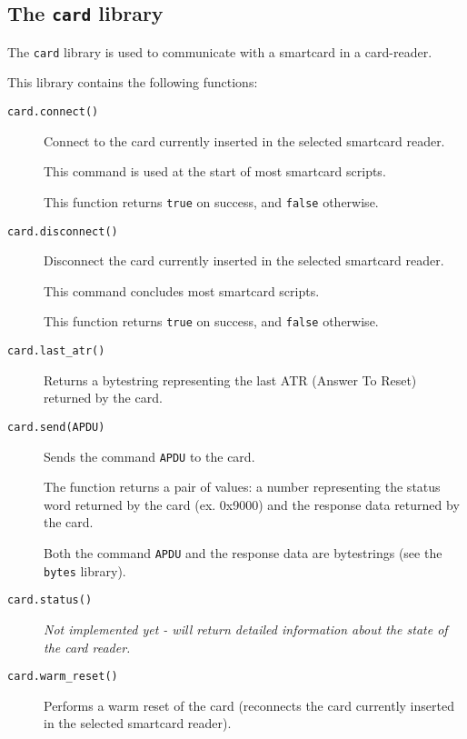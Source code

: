 \documentclass[11pt]{article}
\begin{document}
\subsection{The \texttt{card} library}

The \texttt{card} library is used to communicate with a smartcard in a card-reader.

This library contains the following functions:

\begin{description}

\item[\texttt{card.connect()}]
{
  Connect to the card currently inserted in the selected smartcard reader. 

  This command is used at the start of most smartcard scripts.

  This function returns \texttt{true} on success, and \texttt{false} otherwise.
}

\item[\texttt{card.disconnect()}]
{
  Disconnect the card currently inserted in the selected smartcard reader.
	  
  This command concludes most smartcard scripts.

  This function returns \texttt{true} on success, and \texttt{false} otherwise.
}

\item[\texttt{card.last\_atr()}]
{
  Returns a bytestring representing the last ATR (Answer To Reset) returned by the card.
}

\item[\texttt{card.send(APDU)}]
{
  Sends the command \texttt{APDU} to the card. 

  The function returns a pair of values: a number representing the status word 
  returned by the card (ex. 0x9000) and the response data returned by the card.
  
  Both the command \texttt{APDU} and the response data are bytestrings 
  (see the \texttt{bytes} library).
}

\item[\texttt{card.status()}]
{
  \textit{Not implemented yet - will return detailed information about the state of the card reader.}
}

\item[\texttt{card.warm\_reset()}]
{
  Performs a warm reset of the card 
  (reconnects the card currently inserted in the selected smartcard reader).
}

\end{description}
\end{document}
